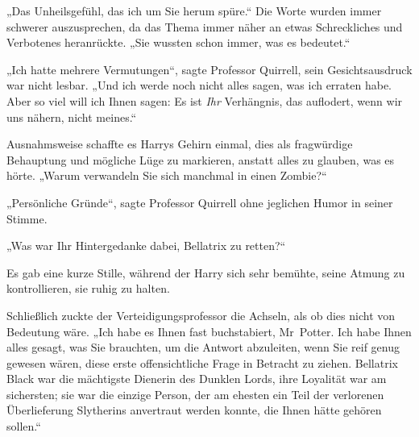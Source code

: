 „Das Unheilsgefühl, das ich um Sie herum spüre.“ Die Worte wurden immer schwerer auszusprechen, da das Thema immer näher an etwas Schreckliches und Verbotenes heranrückte. „Sie wussten schon immer, was es bedeutet.“

„Ich hatte mehrere Vermutungen“, sagte Professor Quirrell, sein Gesichtsausdruck war nicht lesbar. „Und ich werde noch nicht alles sagen, was ich erraten habe. Aber so viel will ich Ihnen sagen: Es ist \emph{Ihr} Verhängnis, das auflodert, wenn wir uns nähern, nicht meines.“

Ausnahmsweise schaffte es Harrys Gehirn einmal, dies als fragwürdige Behauptung und mögliche Lüge zu markieren, anstatt alles zu glauben, was es hörte. „Warum verwandeln Sie sich manchmal in einen Zombie?“

„Persönliche Gründe“, sagte Professor Quirrell ohne jeglichen Humor in seiner Stimme.

„Was war Ihr Hintergedanke dabei, Bellatrix zu retten?“

Es gab eine kurze Stille, während der Harry sich sehr bemühte, seine Atmung zu kontrollieren, sie ruhig zu halten.

Schließlich zuckte der Verteidigungsprofessor die Achseln, als ob dies nicht von Bedeutung wäre. „Ich habe es Ihnen fast buchstabiert, Mr~Potter. Ich habe Ihnen alles gesagt, was Sie brauchten, um die Antwort abzuleiten, wenn Sie reif genug gewesen wären, diese erste offensichtliche Frage in Betracht zu ziehen. Bellatrix Black war die mächtigste Dienerin des Dunklen Lords, ihre Loyalität war am sichersten; sie war die einzige Person, der am ehesten ein Teil der verlorenen Überlieferung Slytherins anvertraut werden konnte, die Ihnen hätte gehören sollen.“

